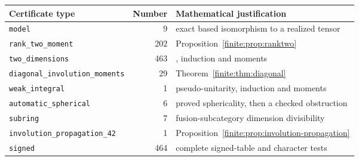 \begin{tabular}{lrl}
\toprule
Certificate type&Number&Mathematical justification\\
\midrule
\texttt{model}&9&exact based isomorphism to a realized tensor\\
\texttt{rank\_two\_moment}&202&Proposition~\ref{finite:prop:ranktwo}\\
\texttt{two\_dimensions}&463&\cite[Lemma~3.1]{Schopieray}, induction and moments\\
\texttt{diagonal\_involution\_moments}&29&Theorem~\ref{finite:thm:diagonal}\\
\texttt{weak\_integral}&1&pseudo-unitarity, induction and moments\\
\texttt{automatic\_spherical}&6&proved sphericality, then a checked obstruction\\
\texttt{subring}&7&fusion-subcategory dimension divisibility\\
\texttt{involution\_propagation\_42}&1&Proposition~\ref{finite:prop:involution-propagation}\\
\texttt{signed}&464&complete signed-table and character tests\\
\bottomrule
\end{tabular}
